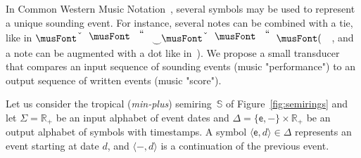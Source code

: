 \documentclass[runningheads]{llncs}
\def\<#1>{\langle #1 \rangle}
\newcommand{\R}{\mathcal{R}}
\newcommand{\Semiring}{\mathbb{S}}
\begin{document}
\begin{example}
In Common Western Music Notation~\cite{Gould11BB}, 
several symbols may be used to represent a unique sounding event.
For instance, several notes can be combined with a tie, 
like in $\musQuarter\!\!\mathrel{\raisebox{-1.5mm}{$\smile$}}\!\!\musEighth$,  
and a note can be augmented with a dot like in~\musQuarterDotted).
We propose a small transducer that compares an input sequence of sounding 
events (music "performance") 
to an output sequence of written events (music "score").

Let us consider the tropical (\emph{min-plus}) semiring~$\Semiring$ 
of Figure~\ref{fig:semirings} and 
let $\Sigma = \mathbb{R}_+$ be an input alphabet of event dates
and $\Delta = \{ \mathsf{e}, \mathsf{-} \} \times \mathbb{R}_+$ 
be an output alphabet of symbols with timestamps. 
A symbol $\< \mathsf{e}, d > \in \Delta$ represents an event starting at date $d$, 
and $\< \mathsf{-}, d >$ is a continuation of the previous event.


\end{example}
\end{document}
